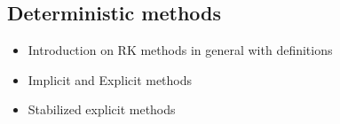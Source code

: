 \subsection{Deterministic methods}

\begin{itemize}
	\item Introduction on RK methods in general with definitions
	\item Implicit and Explicit methods
	\item Stabilized explicit methods
\end{itemize}
